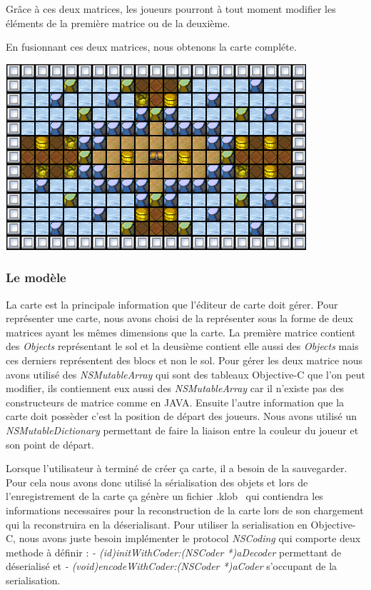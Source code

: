 			Grâce à ces deux matrices, les joueurs pourront à tout moment modifier les éléments de la première matrice ou de la deuxième.
			
			En fusionnant ces deux matrices, nous obtenons la carte compléte.
			\begin{center}
				\includegraphics{./Developpement/Img/image3.png}
			\end{center}
			

	\subsubsection{Le modèle}
		La carte est la principale information que l'éditeur de carte doit gérer. Pour représenter une carte, nous avons choisi de la représenter sous la forme de deux matrices ayant les mêmes dimensions que la carte. La première matrice contient des \textit{Objects} représentant le sol et la deusième contient elle aussi des \textit{Objects} mais ces derniers représentent des blocs et non le sol. Pour gérer les deux matrice nous avons utilisé des \textit{NSMutableArray} qui sont des tableaux Objective-C que l'on peut modifier, ils contiennent eux aussi des \textit{NSMutableArray} car il n'existe pas des constructeurs de matrice comme en JAVA. Ensuite l'autre information que la carte doit possèder c'est la position de départ des joueurs. Nous avons utilisé un \textit{NSMutableDictionary} permettant de faire la liaison entre la couleur du joueur et son point de départ. 
			
		Lorsque l'utilisateur à terminé de créer ça carte, il a besoin de la sauvegarder. Pour cela nous avons donc utilisé la sérialisation des objets et lors de l'enregistrement de la carte ça génère un fichier \og .klob \fg \, qui contiendra les informations necessaires pour la reconstruction de la carte lors de son chargement qui la reconstruira en la déserialisant. Pour utiliser la serialisation en Objective-C, nous avons juste besoin implémenter le protocol \textit{NSCoding} qui comporte deux methode à définir : 
		\textit{- (id)initWithCoder:(NSCoder *)aDecoder} permettant de déserialisé et \textit{- (void)encodeWithCoder:(NSCoder *)aCoder} s'occupant de la serialisation.
	
